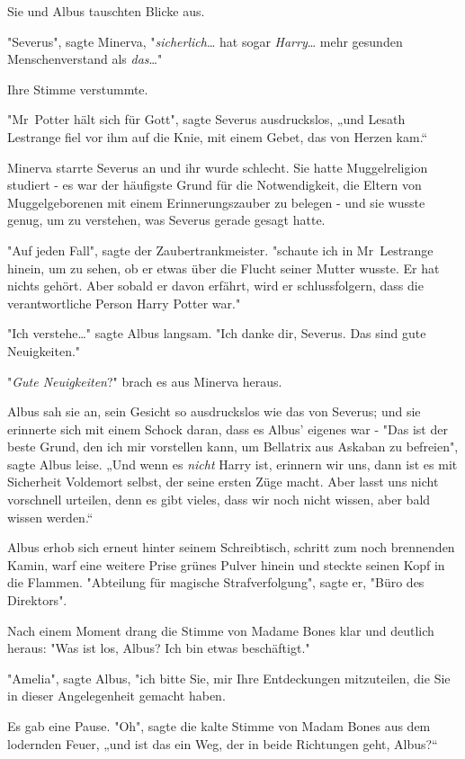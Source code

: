{Sie und Albus tauschten Blicke aus.

"Severus", sagte Minerva, "\emph{sicherlich}… hat sogar \emph{Harry}… mehr gesunden Menschenverstand als \emph{das}…"

Ihre Stimme verstummte.

"Mr~Potter hält sich für Gott", sagte Severus ausdruckslos, „und Lesath Lestrange fiel vor ihm auf die Knie, mit einem Gebet, das von Herzen kam.“

Minerva starrte Severus an und ihr wurde schlecht. Sie hatte Muggelreligion studiert - es war der häufigste Grund für die Notwendigkeit, die Eltern von Muggelgeborenen mit einem Erinnerungszauber zu belegen - und sie wusste genug, um zu verstehen, was Severus gerade gesagt hatte.

"Auf jeden Fall", sagte der Zaubertrankmeister. "schaute ich in Mr~Lestrange hinein, um zu sehen, ob er etwas über die Flucht seiner Mutter wusste. Er hat nichts gehört. Aber sobald er davon erfährt, wird er schlussfolgern, dass die verantwortliche Person Harry Potter war."

"Ich verstehe…" sagte Albus langsam. "Ich danke dir, Severus. Das sind gute Neuigkeiten."

"\emph{Gute Neuigkeiten}?" brach es aus Minerva heraus.

Albus sah sie an, sein Gesicht so ausdruckslos wie das von Severus; und sie erinnerte sich mit einem Schock daran, dass es Albus' eigenes war - "Das ist der beste Grund, den ich mir vorstellen kann, um Bellatrix aus Askaban zu befreien", sagte Albus leise. „Und wenn es \emph{nicht} Harry ist, erinnern wir uns, dann ist es mit Sicherheit Voldemort selbst, der seine ersten Züge macht. Aber lasst uns nicht vorschnell urteilen, denn es gibt vieles, dass wir noch nicht wissen, aber bald wissen werden.“

Albus erhob sich erneut hinter seinem Schreibtisch, schritt zum noch brennenden Kamin, warf eine weitere Prise grünes Pulver hinein und steckte seinen Kopf in die Flammen. "Abteilung für magische Strafverfolgung", sagte er, "Büro des Direktors".

Nach einem Moment drang die Stimme von Madame Bones klar und deutlich heraus: "Was ist los, Albus? Ich bin etwas beschäftigt."

"Amelia", sagte Albus, "ich bitte Sie, mir Ihre Entdeckungen mitzuteilen, die Sie in dieser Angelegenheit gemacht haben.

Es gab eine Pause. "Oh", sagte die kalte Stimme von Madam Bones aus dem lodernden Feuer, „und ist das ein Weg, der in beide Richtungen geht, Albus?“

}
